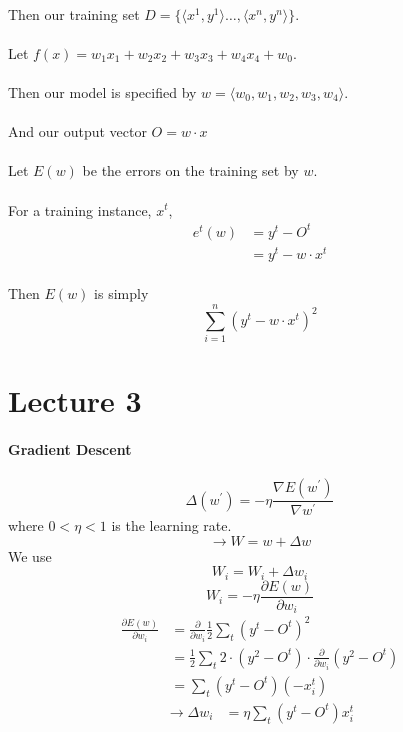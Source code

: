 \documentclass[letterpaper,12pt]{article}
\begin{document}
\paragraph{}Then our training set $D = 
\{\langle x^1, y^1\rangle\ldots, \langle x^n, y^n \rangle\}$.
\paragraph{}Let $f(x) = w_1x_1 + w_2x_2 +w_3x_3 + w_4x_4 + w_0$.
\paragraph{}Then our model is specified by $w = \langle w_0, w_1, w_2, w_3, w_4 \rangle$.
\paragraph{}And our output vector $O = w \cdot x$
\paragraph{}Let $E(w)$ be the errors on the training set by $w$.
\paragraph{}For a training instance, $x^t$, 
\begin{align*}
    e^t(w) &= y^t - O^t\\
           &= y^t - w \cdot x^t 
\end{align*}
\paragraph{}Then $E(w)$ is simply
\[
    \sum_{i=1}^n (y^t - w \cdot x^t)^2
    \]
\section*{Lecture 3}
\paragraph{Gradient Descent}
\[
    \Delta (w^\prime) = -\eta \frac{\nabla E(w^\prime)}{\nabla w^\prime}
\]
where $0 < \eta < 1$ is the learning rate.
\[
    \to W = w + \Delta w
\]
We use
\[
    W_i = W_i + \Delta w_i
\]
\[
    W_i = - \eta \frac{\partial E(w)}{\partial w_i}
\]
\begin{align*}
    \frac{\partial E(w)}{\partial w_i} &= \frac{\partial}{\partial w_i} \frac{1}{2} \sum_t(y^t-O^t)^2\\
                                       &= \frac{1}{2} \sum_t 2\cdot (y^2-O^t) \cdot \frac{\partial}{\partial w_i}
                                       (y^2 - O^t)\\
                                       &= \sum_t (y^t - O^t)(-x_i^t)
\end{align*}
\begin{align*}
    \to \Delta w_i &= \eta \sum_t(y^t - O^t) x_i^t
\end{align*}
\end{document}

